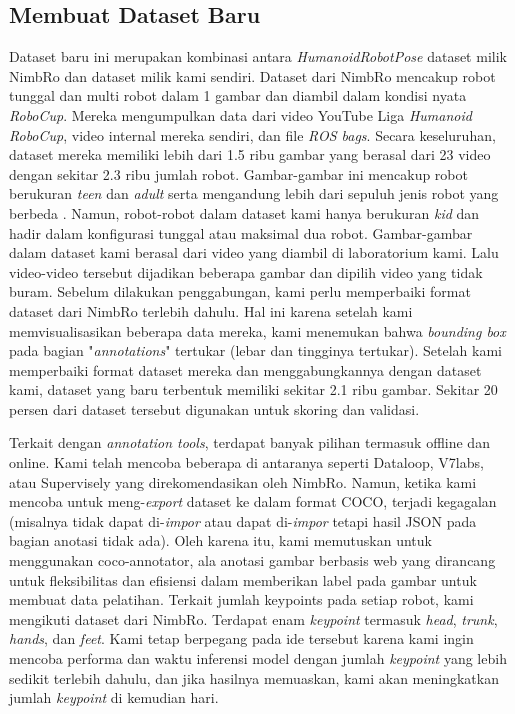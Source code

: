 \subsection{Membuat Dataset Baru}
\label{subsec:make-new-dataset}

Dataset baru ini merupakan kombinasi antara \textit{HumanoidRobotPose} dataset milik NimbRo dan dataset milik kami sendiri. 
Dataset dari NimbRo mencakup robot tunggal dan multi robot dalam 1 gambar dan diambil dalam kondisi nyata \textit{RoboCup}. 
Mereka mengumpulkan data dari video YouTube Liga \textit{Humanoid RoboCup}, video internal mereka sendiri, dan file \textit{ROS bags}. 
Secara keseluruhan, dataset mereka memiliki lebih dari 1.5 ribu gambar yang berasal dari 23 video dengan sekitar 2.3 ribu jumlah robot. 
Gambar-gambar ini mencakup robot berukuran \textit{teen} dan \textit{adult} serta mengandung lebih dari sepuluh jenis robot yang berbeda \parencite{amini2021}.
Namun, robot-robot dalam dataset kami hanya berukuran \textit{kid} dan hadir dalam konfigurasi tunggal atau maksimal dua robot. Gambar-gambar dalam dataset kami berasal dari video yang diambil di laboratorium kami. Lalu video-video tersebut dijadikan beberapa gambar dan dipilih video yang tidak buram.
Sebelum dilakukan penggabungan, kami perlu memperbaiki format dataset dari NimbRo terlebih dahulu. Hal ini karena setelah kami memvisualisasikan beberapa data mereka, kami menemukan bahwa \textit{bounding box} pada bagian "\textit{annotations}" tertukar (lebar dan tingginya tertukar).
Setelah kami memperbaiki format dataset mereka dan menggabungkannya dengan dataset kami, dataset yang baru terbentuk memiliki sekitar 2.1 ribu gambar.
Sekitar 20 persen dari dataset tersebut digunakan untuk skoring dan validasi.

Terkait dengan \textit{annotation tools}, terdapat banyak pilihan termasuk offline dan online. Kami telah mencoba beberapa di antaranya seperti Dataloop, V7labs, atau Supervisely yang direkomendasikan oleh NimbRo. Namun, ketika kami mencoba untuk meng-\textit{export} dataset ke dalam format COCO,
terjadi kegagalan (misalnya tidak dapat di-\textit{impor} atau dapat di-\textit{impor} tetapi hasil JSON pada bagian anotasi tidak ada). Oleh karena itu, kami memutuskan untuk menggunakan coco-annotator, ala anotasi gambar berbasis web yang dirancang untuk fleksibilitas dan efisiensi dalam memberikan label pada gambar untuk membuat data pelatihan.
Terkait jumlah keypoints pada setiap robot, kami mengikuti dataset dari NimbRo. Terdapat enam \textit{keypoint} termasuk \textit{head}, \textit{trunk}, \textit{hands}, dan \textit{feet}. Kami tetap berpegang pada ide tersebut karena kami ingin mencoba performa dan waktu inferensi model dengan jumlah \textit{keypoint} yang lebih sedikit terlebih dahulu, dan jika hasilnya memuaskan, kami akan meningkatkan jumlah \textit{keypoint} di kemudian hari.

